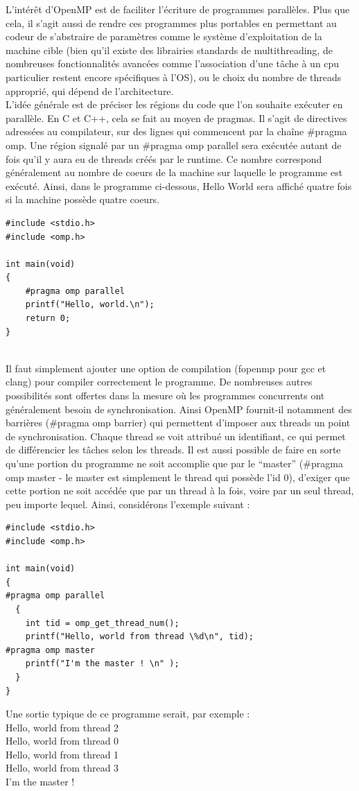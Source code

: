 \documentclass{report}
\begin{document}
L'intérêt d'OpenMP est de faciliter l'écriture de programmes parallèles. Plus que cela, il s'agit aussi 
de rendre ces programmes plus portables en permettant au codeur de s'abstraire de paramètres comme le 
système d'exploitation de la machine cible (bien qu'il existe des librairies standards de multithreading, 
de nombreuses fonctionnalités avancées comme l'association d'une tâche à un cpu particulier restent encore
spécifiques à l'OS), ou le choix du nombre de threads approprié, qui dépend de l'architecture.
\\L'idée générale est de préciser les régions du code que l'on souhaite exécuter en parallèle. En C et 
C++, cela se fait au moyen de pragmas. Il s'agit de directives adressées au compilateur, sur des lignes qui 
commencent par la chaîne \#pragma omp. Une région signalé par un \#pragma omp parallel sera 
exécutée autant de fois qu'il y aura eu de threads créés par le runtime. Ce nombre correspond généralement 
au nombre de coeurs de la machine sur laquelle le programme est exécuté. Ainsi, dans le programme 
ci-dessous, Hello World sera affiché quatre fois si la machine possède quatre coeurs.
\begin{lstlisting}
#include <stdio.h>
#include <omp.h>

int main(void)
{
    #pragma omp parallel
    printf("Hello, world.\n");
    return 0;
}


\end{lstlisting}

Il faut simplement ajouter une option de compilation (fopenmp pour gcc et clang) pour compiler
correctement le programme.
De nombreuses autres possibilités sont offertes dans la mesure où les programmes concurrents ont
généralement besoin de synchronisation. Ainsi OpenMP fournit-il notamment des barrières (\#pragma
omp barrier) qui permettent d'imposer aux threads un point de synchronisation. Chaque thread se voit 
attribué un identifiant, ce qui permet de différencier les tâches selon les threads. Il est aussi
possible de faire en sorte qu'une portion du programme ne soit accomplie que par le ``master''
(\#pragma omp master - le master est simplement le thread qui possède l'id 0), d'exiger que cette
portion ne soit accédée que par un thread à la fois, voire par un seul thread, peu importe lequel.
Ainsi, considérons l'exemple suivant : 
\begin{lstlisting}
#include <stdio.h>
#include <omp.h>

int main(void)
{
#pragma omp parallel
  {
    int tid = omp_get_thread_num();
    printf("Hello, world from thread \%d\n", tid);
#pragma omp master
    printf("I'm the master ! \n" );
  }
}
\end{lstlisting}
Une sortie typique de ce programme serait, par exemple :
\\Hello, world from thread 2
\\Hello, world from thread 0
\\Hello, world from thread 1
\\Hello, world from thread 3
\\ I'm the master ! 
\end{document}
